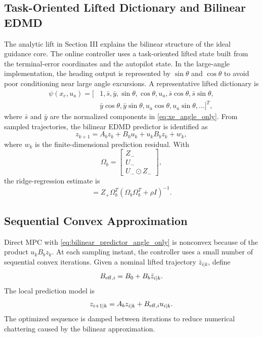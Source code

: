 \documentclass[letterpaper,journal]{IEEEtran}
\begin{document}
\subsection{Task-Oriented Lifted Dictionary and Bilinear EDMD}
The analytic lift in Section III explains the bilinear structure of the ideal guidance core. The online controller uses a task-oriented lifted state built from the terminal-error coordinates and the autopilot state. In the large-angle implementation, the heading output is represented by $\sin\theta$ and $\cos\theta$ to avoid poor conditioning near large angle excursions. A representative lifted dictionary is
\begin{align}
    \psi(x_e,u_a)=
    [&1,\bar s,\bar y,\sin\theta,\cos\theta,u_a,\bar s\cos\theta,
    \bar s\sin\theta, \nonumber\\
    &\bar y\cos\theta,\bar y\sin\theta,
    u_a\cos\theta,u_a\sin\theta,\ldots]^T ,
    \label{eq:dictionary_angle_only}
\end{align}
where $\bar s$ and $\bar y$ are the normalized components in \eqref{eq:xe_angle_only}. From sampled trajectories, the bilinear EDMD predictor is identified as
\begin{equation}
    z_{k+1}=A_b z_k+B_0u_k+u_kB_bz_k+w_k ,
    \label{eq:bilinear_predictor_angle_only}
\end{equation}
where $w_k$ is the finite-dimensional prediction residual. With
\begin{equation}
    \Omega_b=
    \begin{bmatrix}
    Z_-\\ U_-\\ U_-\odot Z_-
    \end{bmatrix},
\end{equation}
the ridge-regression estimate is
\begin{equation}
    [A_b\;B_0\;B_b]=Z_+\Omega_b^T
    (\Omega_b\Omega_b^T+\rho I)^{-1}.
\end{equation}

\subsection{Sequential Convex Approximation}
Direct MPC with \eqref{eq:bilinear_predictor_angle_only} is nonconvex because of the product $u_kB_bz_k$. At each sampling instant, the controller uses a small number of sequential convex iterations. Given a nominal lifted trajectory $\bar z_{i|k}$, define
\begin{equation}
    B_{{\rm eff},i}=B_0+B_b\bar z_{i|k}.
\end{equation}
The local prediction model is
\begin{equation}
    z_{i+1|k}=A_bz_{i|k}+B_{{\rm eff},i}u_{i|k}.
    \label{eq:ltv_prediction_angle_only}
\end{equation}
The optimized sequence is damped between iterations to reduce numerical chattering caused by the bilinear approximation.
\end{document}
